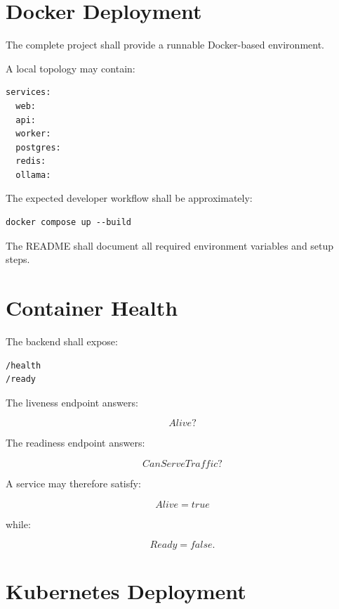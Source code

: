 \documentclass[11pt,a4paper]{article}
\begin{document}
\section{Docker Deployment}

The complete project shall provide a runnable Docker-based environment.

A local topology may contain:

\begin{lstlisting}
services:
  web:
  api:
  worker:
  postgres:
  redis:
  ollama:
\end{lstlisting}

The expected developer workflow shall be approximately:

\begin{lstlisting}
docker compose up --build
\end{lstlisting}

The README shall document all required environment variables and setup
steps.

\section{Container Health}

The backend shall expose:

\begin{lstlisting}
/health
/ready
\end{lstlisting}

The liveness endpoint answers:

\[
Alive?
\]

The readiness endpoint answers:

\[
CanServeTraffic?
\]

A service may therefore satisfy:

\[
Alive=true
\]

while:

\[
Ready=false.
\]

\section{Kubernetes Deployment}
\end{document}
